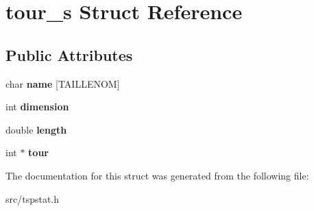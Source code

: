 \hypertarget{structtour__s}{}\section{tour\+\_\+s Struct Reference}
\label{structtour__s}
\subsection*{Public Attributes}
\begin{DoxyCompactItemize}
\item 
\mbox{\label{structtour__s_a958eab48df11fbf1def316dfd313818e}} 
char {\bfseries name} \mbox{[}T\+A\+I\+L\+L\+E\+N\+OM\mbox{]}
\item 
\mbox{\label{structtour__s_ab82b58d8f3e2370db763ffd0cac5b3b6}} 
int {\bfseries dimension}
\item 
\mbox{\label{structtour__s_a081be2269828ba943a1f30cab95e5132}} 
double {\bfseries length}
\item 
\mbox{\label{structtour__s_a4570116376241050babcdb941bb29999}} 
int $\ast$ {\bfseries tour}
\end{DoxyCompactItemize}


The documentation for this struct was generated from the following file\+:\begin{DoxyCompactItemize}
\item 
src/tspstat.\+h\end{DoxyCompactItemize}
